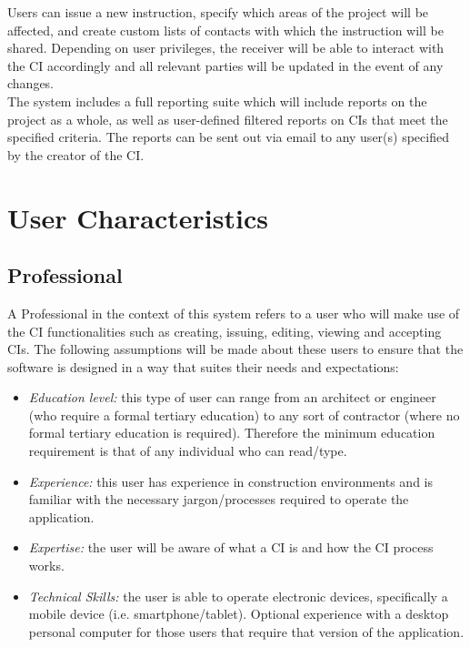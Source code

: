 \documentclass[11pt]{article}
\begin{document}
\begin{flushleft}
Users can issue a new instruction, specify which areas of the project will be affected, and create custom lists of contacts with which the instruction will be shared. Depending on user privileges, the receiver will be able to interact with the CI accordingly and all relevant parties will be updated in the event of any changes.\\[0.5cm]

The system includes a full reporting suite which will include reports on the project as a whole, as well as user-defined filtered reports on CIs that meet the specified criteria. The reports can be sent out via email to any user(s) specified by the creator of the CI.\\[0.5cm]
\end{flushleft}

\newpage

\section{User Characteristics}
\subsection{Professional}
A Professional in the context of this system refers to a user who will make use of the CI functionalities such as creating, issuing, editing, viewing and accepting CIs. The following assumptions will be made about these users to ensure that the software is designed in a way that suites their needs and expectations:
\begin{itemize}
    \item \textit{Education level:} this type of user can range from an architect or engineer (who require a formal tertiary education) to any sort of contractor (where no formal tertiary education is required). Therefore the minimum education requirement is that of any individual who can read/type.
    \item \textit{Experience:} this user has experience in construction environments and is familiar with the necessary jargon/processes required to operate the application.
    \item \textit{Expertise:} the user will be aware of what a CI is and how the CI process works.
    \item \textit{Technical Skills:} the user is able to operate electronic devices, specifically a mobile device (i.e. smartphone/tablet). Optional experience with a desktop personal computer for those users that require that version of the application.
\end{itemize}
\end{document}
